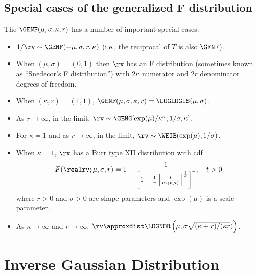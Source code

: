 \subsection{Special cases of the generalized F distribution}
The $\GENF(\mu, \sigma, \kappa,r)$ has a number of important special cases:
\begin{itemize}
\item 
$1 / \rv \sim
\GENF(-\mu, \sigma, r, \kappa)$ (i.e., the reciprocal of $T$ is also $\GENF$).
\item 
When $(\mu,\sigma)=(0,1)$ then $\rv$ has an F distribution
(sometimes known as ``Snedecor's F distribution'') with $2\kappa$
numerator and $2r$ denominator degrees of freedom.
\item 
When $(\kappa,r)=(1,1)$, $\GENF(\mu, \sigma, \kappa,r) =
\LOGLOGIS(\mu, \sigma)$. 
\item 
As $r \rightarrow
\infty$, in the limit, $\rv \sim
          \GENG[\exp(\mu)/\kappa^{\sigma}, 1/\sigma, \kappa]$.
\item
For $\kappa=1$ and as $r \rightarrow
\infty$, in the limit, $\rv \sim \WEIB(\exp(\mu) , 1/\sigma)$.
\item
When $\kappa=1$, $\rv$ has a Burr type XII distribution with cdf
\begin{displaymath}
F(\realrv; \mu, \sigma, r) = 1 -\frac{1}{ \left [1 + \frac{1}{r} \left[
 \frac{t}{ \exp(\mu)} \right]^{\frac{1}{ \sigma }} \right ]^{r}}, \quad t>0
\end{displaymath}
where $r > 0$ and $\sigma > 0$ are shape parameters and $\exp(\mu)$ is 
a scale parameter.
\item 
As $\kappa \to \infty$ and $r \to
\infty$, $\rv \approxdist \LOGNOR \left ( \mu, \sigma \sqrt{( \kappa
+r)/ (\kappa r}) \right )$.

\end{itemize}


\section{Inverse Gaussian Distribution}

